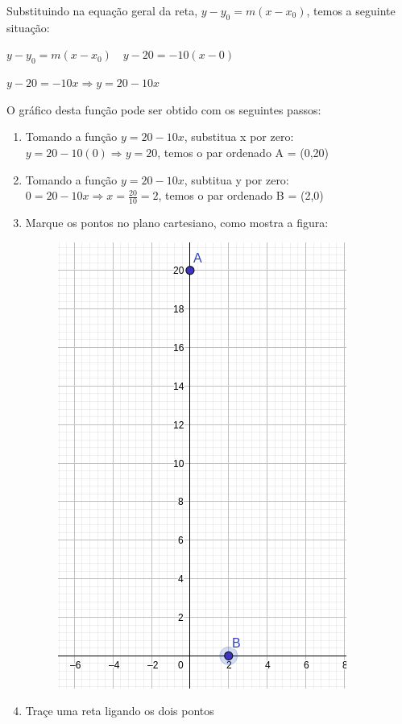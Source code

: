 \begin{multicols*}{2}
    Substituindo na equação geral da reta, $y - y_0 = m(x-x_0)$, temos a seguinte situação:

    $y - y_0 = m(x-x_0) \quad y - 20 = -10(x-0)$

    $y - 20 = -10x  \Rightarrow y = 20 -10x$

    O gráfico desta função pode ser obtido com os seguintes passos:
    \begin{enumerate}[wide, labelwidth=!, labelindent=0pt]
        \item Tomando a função $ y = 20 -10x$, substitua x por zero: $y = 20 - 10(0) \Rightarrow
                  y = 20$, temos o par ordenado A = (0,20)
        \item Tomando a função $ y = 20 -10x$, subtitua y por zero: $0 = 20 - 10x \Rightarrow
                  x = \frac{20}{10} = 2$, temos o par ordenado B = (2,0)
        \item Marque os pontos no plano cartesiano, como mostra a figura:
              \begin{figure}[H]
                  \centering
                  \includegraphics[scale=0.3]{assets/rafael/img12.png}
              \end{figure}
        \item Traçe uma reta ligando os dois pontos

\end{enumerate}
\end{multicols*}
